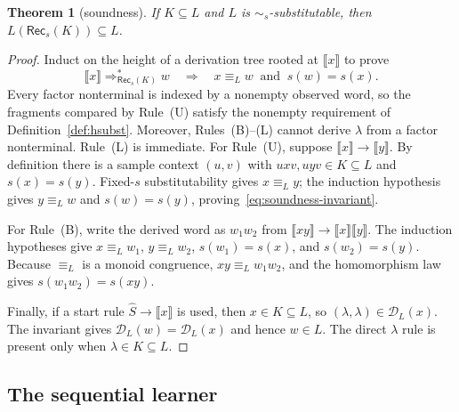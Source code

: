\documentclass[11pt,a4paper]{article}
\newcommand{\NT}[1]{\llbracket #1\rrbracket}
\newtheorem{theorem}{Theorem}[section]
\theoremstyle{remark}
\theoremstyle{plain}
\newcommand{\D}{\mathcal{D}}
\begin{document}
\begin{theorem}[soundness]\label{thm:soundness}
If $K\subseteq L$ and $L$ is $\sim_s$-substitutable, then
$L(\mathsf{Rec}_s(K))\subseteq L$.
\end{theorem}

\begin{proof}
Induct on the height of a derivation tree rooted at $\NT{x}$ to prove
\begin{equation}\label{eq:soundness-invariant}
 \NT{x}\Rightarrow_{\mathsf{Rec}_s(K)}^*w
 \quad\Longrightarrow\quad
 x\equiv_L w\ \text{ and }\ s(w)=s(x).
\end{equation}
Every factor nonterminal is indexed by a nonempty observed word,
so the fragments compared by Rule~\textup{(U)} satisfy the nonempty
requirement of Definition~\ref{def:hsubst}.  Moreover,
Rules~\textup{(B)}--\textup{(L)} cannot derive $\lambda$ from a
factor nonterminal.  Rule~\textup{(L)} is immediate.  For Rule~\textup{(U)}, suppose
$\NT{x}\to\NT{y}$.  By definition there is a sample context $(u,v)$ with
$uxv,uyv\in K\subseteq L$ and $s(x)=s(y)$.  Fixed-$s$ substitutability gives
$x\equiv_L y$; the induction hypothesis gives $y\equiv_L w$ and
$s(w)=s(y)$, proving~\eqref{eq:soundness-invariant}.

For Rule~\textup{(B)}, write the derived word as $w_1w_2$ from
$\NT{xy}\to\NT{x}\NT{y}$.  The induction hypotheses give
$x\equiv_L w_1$, $y\equiv_L w_2$,
$s(w_1)=s(x)$, and $s(w_2)=s(y)$.
Because $\equiv_L$ is a monoid congruence,
$xy\equiv_L w_1w_2$, and the homomorphism law gives
$s(w_1w_2)=s(xy)$.

Finally, if a start rule $\widehat S\to\NT{x}$ is used, then $x\in K\subseteq L$,
so $(\lambda,\lambda)\in\D_L(x)$.  The invariant gives
$\D_L(w)=\D_L(x)$ and hence $w\in L$.  The direct $\lambda$ rule is present
only when $\lambda\in K\subseteq L$.
\end{proof}

\subsection{The sequential learner}
\end{document}
